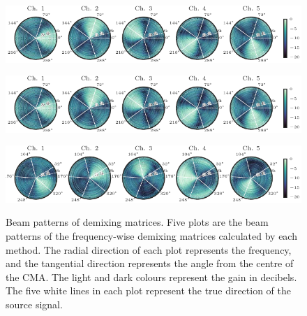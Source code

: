 \documentclass[sip,biber]{now-journal}
\begin{document}
\begin{figure}[t]
  \centering
  \begin{minipage}[t]{\linewidth}
    \centering\includegraphics{figures/plots/beam-pattern/sfiiva-cov_ref.pdf}\label{fig:plot:bp:ref}
  \end{minipage}
  \begin{minipage}[t]{\linewidth}
    \centering\includegraphics{figures/plots/beam-pattern/sfiiva-obs_rot.pdf}\label{fig:plot:bp:sfiivao}
  \end{minipage}
  \begin{minipage}[t]{\linewidth}
    \centering\includegraphics{figures/plots/beam-pattern/sfiiva-cov_rot.pdf}\label{fig:plot:bp:sfiivam}
  \end{minipage}
  \caption{%
    Beam patterns of demixing matrices.
    Five plots are the beam patterns of the frequency-wise demixing matrices calculated by each method.
    The radial direction of each plot represents the frequency, and the tangential direction represents the angle from the centre of the CMA.
    The light and dark colours represent the gain in decibels.
    The five white lines in each plot represent the true direction of the source signal.
  }%
  \label{fig:plot:beam}
\end{figure}
\end{document}
